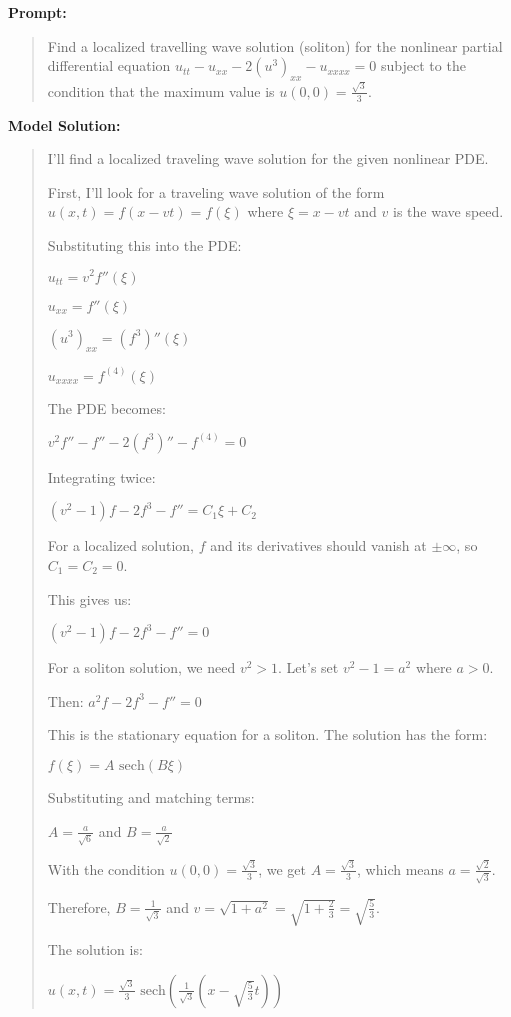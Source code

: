\documentclass{article}
\begin{document}
\textbf{Prompt:}
\begin{quote}
Find a localized travelling wave solution (soliton) for the nonlinear partial differential equation $u_{tt} - u_{xx} - 2 (u^3)_{xx} - u_{xxxx}=0$ subject to the condition that the maximum value is $u(0,0) = \frac{\sqrt{3}}{3}$.
\end{quote}
\textbf{Model Solution:}
\begin{quote}
I'll find a localized traveling wave solution for the given nonlinear PDE.



First, I'll look for a traveling wave solution of the form $u(x,t) = f(x-vt) = f(\xi)$ where $\xi = x-vt$ and $v$ is the wave speed.



Substituting this into the PDE:

$u_{tt} = v^2 f''(\xi)$

$u_{xx} = f''(\xi)$

$(u^3)_{xx} = (f^3)''(\xi)$

$u_{xxxx} = f^{(4)}(\xi)$



The PDE becomes:

$v^2 f'' - f'' - 2(f^3)'' - f^{(4)} = 0$



Integrating twice:

$(v^2-1)f - 2f^3 - f'' = C_1 \xi + C_2$



For a localized solution, $f$ and its derivatives should vanish at $\pm\infty$, so $C_1 = C_2 = 0$.



This gives us:

$(v^2-1)f - 2f^3 - f'' = 0$



For a soliton solution, we need $v^2 > 1$. Let's set $v^2-1 = a^2$ where $a > 0$.



Then: $a^2 f - 2f^3 - f'' = 0$



This is the stationary equation for a soliton. The solution has the form:

$f(\xi) = A\text{ sech}(B\xi)$



Substituting and matching terms:

$A = \frac{a}{\sqrt{6}}$ and $B = \frac{a}{\sqrt{2}}$



With the condition $u(0,0) = \frac{\sqrt{3}}{3}$, we get $A = \frac{\sqrt{3}}{3}$, which means $a = \frac{\sqrt{2}}{\sqrt{3}}$.



Therefore, $B = \frac{1}{\sqrt{3}}$ and $v = \sqrt{1+a^2} = \sqrt{1+\frac{2}{3}} = \sqrt{\frac{5}{3}}$.



The solution is:



$\boxed{u(x,t) = \frac{\sqrt{3}}{3}\text{ sech}\left(\frac{1}{\sqrt{3}}(x-\sqrt{\frac{5}{3}}t)\right)}$
\end{quote}
\end{document}
